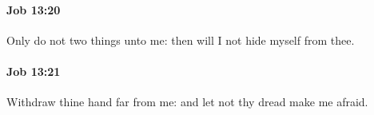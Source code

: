 		\paragraph{Job 13:20} %
			\label{JOB-13-20}

			Only do not two things unto me: then will I not hide myself from thee.


		\paragraph{Job 13:21} %
			\label{JOB-13-21}

			Withdraw thine hand far from me: and let not thy dread make me afraid.


